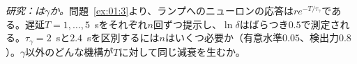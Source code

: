 \begin{exercise}[\lvlC]
\label{ex:01:7}
\emph{研究：は$\gamma$か。}問題~\ref{ex:01:3}より、ランプへのニューロンの応答は$re^{-T/\tau_\gamma}$である。遅延$T=1,\dots,5$~sをそれぞれ$n$回ずつ提示し、$\ln\delta$はばらつき$0.5$で測定される。$\tau_\gamma=2$~sと$2.4$~sを区別するには$n$はいくつ必要か（有意水準$0.05$、検出力$0.8$）。$\gamma$以外のどんな機構が$T$に対して同じ減衰を生むか。
\end{exercise}
